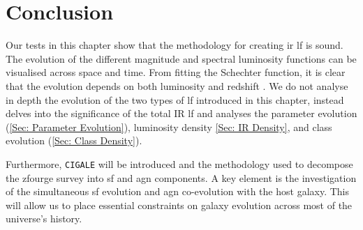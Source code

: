\section{Conclusion}
Our tests in this chapter show that the methodology for creating \gls{ir} \gls{lf} is sound. The evolution of the different magnitude and spectral luminosity functions can be visualised across space and time. From fitting the Schechter function, it is clear that the evolution depends on both luminosity and redshift \citep{wu_mid-infrared_2011}. We do not analyse in depth the evolution of the two types of \gls{lf} introduced in this chapter, instead  delves into the significance of the total IR \gls{lf} and analyses the parameter evolution (\cref{Sec: Parameter Evolution}), luminosity density \cref{Sec: IR Density}, and class evolution (\cref{Sec: Class Density}).

Furthermore, \texttt{CIGALE} will be introduced and the methodology used to decompose the \gls{zfourge} survey \citep{straatman_fourstar_2016} into \gls{sf} and \gls{agn} components. A key element is the investigation of the simultaneous \gls{sf} evolution and \gls{agn} co-evolution with the host galaxy. This will allow us to place essential constraints on galaxy evolution across most of the universe's history.